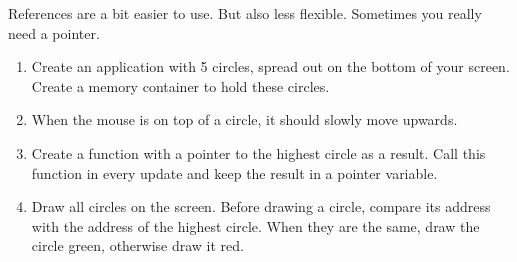 References are a bit easier to use. But also less flexible. Sometimes you really need a pointer.

\begin{exercise}
\begin{enumerate}
  \item Create an application with 5 circles, spread out on the bottom of your screen. Create a memory container to hold these circles.
	\item When the mouse is on top of a circle, it should slowly move upwards.
	\item Create a function with a pointer to the highest circle as a result. Call this function in every update and keep the result in a pointer variable.
	\item Draw all circles on the screen. Before drawing a circle, compare its address with the address of the highest circle. When they are the same, draw the circle green, otherwise draw it red.
\end{enumerate}
\end{exercise}

	